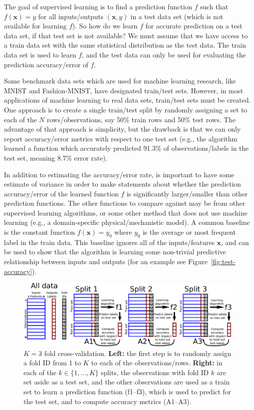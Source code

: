 \documentclass[12pt]{article}
\begin{document}
The goal of supervised learning is to find a prediction function $f$
such that $f(\mathbf x) = y$ for all inputs/outputs $(\mathbf x,y)$ in
a test data set (which is not available for learning
$f$). So how do we learn $f$ for accurate prediction on a test data
set, if that test set is not available? We must assume that we have
access to a train data set with the same statistical distribution as
the test data. The train data set is used to learn $f$, and the test
data can only be used for evaluating the prediction accuracy/error of
$f$.

Some benchmark data sets which are used for machine learning research,
like MNIST and Fashion-MNIST, have designated train/test
sets. However, in most applications of machine learning to real data
sets, train/test sets must be created. One approach is to create a
single train/test split by randomly assigning a set to each of the $N$
rows/observations, say 50\% train rows and 50\% test rows. The
advantage of that approach is simplicity, but the drawback is that we
can only report accuracy/error metrics with respect to one test set
(e.g., the algorithm learned a function which accurately predicted
91.3\% of observations/labels in the test set, meaning 8.7\% error
rate). 

In addition to estimating the accuracy/error rate, is important to
have some estimate of variance in order to make statements about
whether the prediction accuracy/error of the learned function $f$ is
significantly larger/smaller than other prediction functions. The
other functions to compare against may be from other supervised
learning algorithms, or some other method that does not use machine
learning (e.g., a domain-specific physical/mechanistic model). A common
baseline is the constant function $f(\mathbf x) = y_0$ where $y_0$ is
the average or most frequent label in the train data. This baseline
ignores all of the inputs/features $\mathbf x$, and can be used to
show that the algorithm is learning some non-trivial predictive relationship
between inputs and outputs (for an example see
Figure~\ref{fig:test-accuracy}).

\begin{figure}
  \centering
  \includegraphics[width=\textwidth]{drawing-cross-validation}
  \caption{$K=3$ fold cross-validation. \textbf{Left:} the first step
    is to randomly assign a fold ID from 1 to $K$ to each of the
    observations/rows. \textbf{Right:} in each of the
    $k\in\{1, \dots, K\}$ splits, the observations with fold ID $k$
    are set aside as a test set, and the other observations are used
    as a train set to learn a prediction function (f1--f3), which is
    used to predict for the test set, and to compute accuracy metrics
    (A1--A3).}
  \label{fig:cross-validation}
\end{figure}
\end{document}
